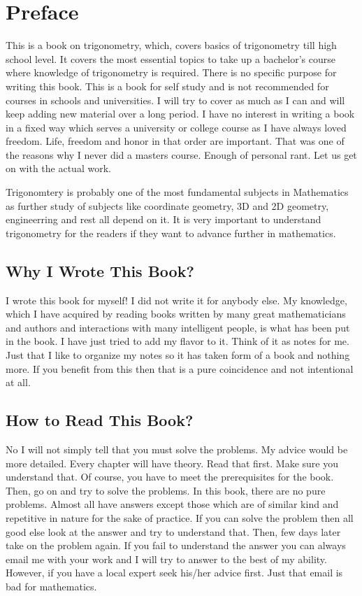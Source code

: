 \chapter{Preface}
This is a book on trigonometry, which, covers basics of trigonometry till high school level. It covers the most essential topics to
take up a bachelor's course where knowledge of trigonometry is required. There is no specific purpose for writing this book. This
is a book for self study and is not recommended for courses in schools and universities. I will try to cover as much as I can and
will keep adding new material over a long period. I have no interest in writing a book in a fixed way which serves a university or
college course as I have always loved freedom. Life, freedom and honor in that order are important. That was one of the reasons why
I never did a masters course. Enough of personal rant. Let us get on with the actual work.

Trigonomtery is probably one of the most fundamental subjects in Mathematics as further study of subjects like coordinate geometry,
3D and 2D geometry, engineerring and rest all depend on it. It is very important to understand trigonometry for the readers if they
want to advance further in mathematics.

\section*{Why I Wrote This Book?}
I wrote this book for myself! I did not write it for anybody else. My knowledge, which I have acquired by reading books written by
many great mathematicians and authors and interactions with many intelligent people, is what has been put in the book. I have just
tried to add my flavor to it. Think of it as notes for me. Just that I like to organize my notes so it has taken form of a book and
nothing more. If you benefit from this then that is a pure coincidence and not intentional at all.

\section*{How to Read This Book?}
No I will not simply tell that you must solve the problems. My advice would be more detailed. Every chapter will have theory. Read
that first. Make sure you understand that. Of course, you have to meet the prerequisites for the book. Then, go on and try to solve
the problems. In this book, there are no pure problems. Almost all have answers except those which are of similar kind and
repetitive in nature for the sake of practice. If you can solve the problem then all good else look at the answer and try to
understand that. Then, few days later take on the problem again. If you fail to understand the answer you can always email me with
your work and I will try to answer to the best of my ability. However, if you have a local expert seek his/her advice first. Just
that email is bad for mathematics.

